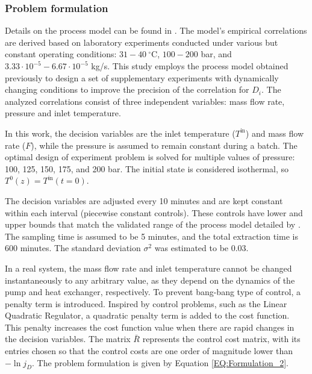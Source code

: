 \documentclass[../Article_Design_of_Experiment.tex]{subfiles}
\begin{document}
	\subsubsection{Problem formulation}
	
	Details on the process model can be found in \citet{Sliczniuk2024}. The model's empirical correlations are derived based on laboratory experiments conducted under various but constant operating conditions: $31 - 40~^\circ\text{C}$, $100 - 200$ bar, and $3.33 \cdot 10^{-5} - 6.67 \cdot 10^{-5}$ kg/s. This study employs the process model obtained previously to design a set of supplementary experiments with dynamically changing conditions to improve the precision of the correlation for $D_i$. The analyzed correlations consist of three independent variables: mass flow rate, pressure and inlet temperature. 
	
	In this work, the decision variables are the inlet temperature ($T^{\text{in}}$) and mass flow rate ($F$), while the pressure is assumed to remain constant during a batch. The optimal design of experiment problem is solved for multiple values of pressure: 100, 125, 150, 175, and 200 bar. The initial state is considered isothermal, so $T^0(z) = T^{\text{in}}(t=0)$.
	
	The decision variables are adjusted every 10 minutes and are kept constant within each interval (piecewise constant controls). These controls have lower and upper bounds that match the validated range of the process model detailed by \citet{Sliczniuk2024}. The sampling time is assumed to be 5 minutes, and the total extraction time is 600 minutes. The standard deviation $\sigma^2$ was estimated to be 0.03.
	
	In a real system, the mass flow rate and inlet temperature cannot be changed instantaneously to any arbitrary value, as they depend on the dynamics of the pump and heat exchanger, respectively. To prevent bang-bang type of control, a penalty term is introduced. Inspired by control problems, such as the Linear Quadratic Regulator, a quadratic penalty term is added to the cost function. This penalty increases the cost function value when there are rapid changes in the decision variables. The matrix $\bar{R}$ represents the control cost matrix, with its entries chosen so that the control costs are one order of magnitude lower than $-\ln j_D$. The problem formulation is given by Equation \ref{EQ:Formulation_2}.
	
\end{document}
